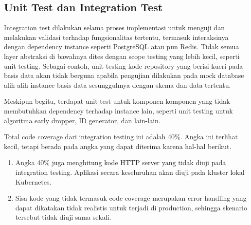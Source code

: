 \subsection{Unit Test dan Integration Test}

Integration test dilakukan selama proses implementasi untuk menguji dan melakukan validasi terhadap fungsionalitas tertentu, termasuk interaksinya dengan dependency instance seperti PostgreSQL atau pun Redis. Tidak semua layer abstraksi di bawahnya dites dengan scope testing yang lebih kecil, seperti unit testing. Sebagai contoh, unit testing kode repository yang berisi kueri pada basis data akan tidak berguna apabila pengujian dilakukan pada mock database alih-alih instance basis data sesungguhnya dengan skema dan data tertentu.

Meskipun begitu, terdapat unit test untuk komponen-komponen yang tidak membutuhkan dependency terhadap instance lain, seperti unit testing untuk algoritma early dropper, ID generator, dan lain-lain.

Total code coverage dari integration testing ini adalah 40\%. Angka ini terlihat kecil, tetapi berada pada angka yang dapat diterima karena hal-hal berikut.

\begin{enumerate}
    \item Angka 40\% juga menghitung kode HTTP server yang tidak diuji pada integration testing. Aplikasi secara keseluruhan akan diuji pada kluster lokal Kubernetes.
    \item Sisa kode yang tidak termasuk code coverage merupakan error handling yang dapat dikatakan tidak realistis untuk terjadi di production, sehingga skenario tersebut tidak diuji sama sekali.
\end{enumerate}
